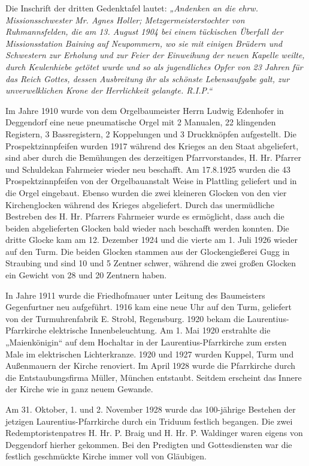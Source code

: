 \documentclass[12pt,a4paper]{book}
\begin{document}
Die Inschrift der dritten Gedenktafel lautet: \emph{„Andenken an die ehrw.
Missionsschwester Mr. Agnes Holler; Metzgermeisterstochter von Ruhmannsfelden,
die am 13. August 1904 bei einem tückischen Überfall der Missionsstation Baining
auf Neupommern, wo sie mit einigen Brüdern und Schwestern zur Erholung und zur
Feier der Einweihung der neuen Kapelle weilte, durch Keulenhiebe getötet wurde
und so als jugendliches Opfer von 23 Jahren für das Reich Gottes, dessen
Ausbreitung ihr als schönste Lebensaufgabe galt, zur unverwelklichen Krone der
Herrlichkeit gelangte. R.I.P.“}

Im Jahre 1910 wurde von dem Orgelbaumeister Herrn Ludwig Edenhofer in Deggendorf
eine neue pneumatische Orgel mit 2 Manualen, 22 klingenden Registern, 3
Bassregistern, 2 Koppelungen und 3 Druckknöpfen aufgestellt. Die
Prospektzinnpfeifen wurden 1917 während des Krieges an den Staat abgeliefert,
sind aber durch die Bemühungen des derzeitigen Pfarrvorstandes, H. Hr. Pfarrer
und Schuldekan Fahrmeier wieder neu beschafft. Am 17.8.1925 wurden die 43
Prospektzinnpfeifen von der Orgelbauanstalt Weise in Plattling geliefert und in
die Orgel eingebaut. Ebenso wurden die zwei kleineren Glocken von den vier
Kirchenglocken während des Krieges abgeliefert. Durch das unermüdliche Bestreben
des H. Hr. Pfarrers Fahrmeier wurde es ermöglicht, dass auch die beiden
abgelieferten Glocken bald wieder nach beschafft werden konnten. Die dritte
Glocke kam am 12. Dezember 1924 und die vierte am 1. Juli 1926 wieder auf den
Turm. Die beiden Glocken stammen aus der Glockengießerei Gugg in Straubing und
sind 10 und 5 Zentner schwer, während die zwei großen Glocken ein Gewicht von 28
und 20 Zentnern haben.

In Jahre 1911 wurde die Friedhofmauer unter Leitung des Baumeisters Gegenfurtner
neu aufgeführt. 1916 kam eine neue Uhr auf den Turm, geliefert von der
Turmuhrenfabrik E. Strobl, Regensburg. 1920 bekam die Laurentius-Pfarrkirche
elektrische Innenbeleuchtung. Am 1. Mai 1920 erstrahlte die „Maienkönigin“ auf
dem Hochaltar in der Laurentius-Pfarrkirche zum ersten Male im elektrischen
Lichterkranze. 1920 und 1927 wurden Kuppel, Turm und Außenmauern der Kirche
renoviert. Im April 1928 wurde die Pfarrkirche durch die Entstaubungsfirma
Müller, München entstaubt. Seitdem erscheint das Innere der Kirche wie in ganz
neuem Gewande.

Am 31. Oktober, 1. und 2. November 1928 wurde das 100-jährige Bestehen der
jetzigen Laurentius-Pfarrkirche durch ein Triduum festlich begangen. Die zwei
Redemptoristenpatres H. Hr. P. Braig und H. Hr. P. Waldinger waren eigens von
Deggendorf hierher gekommen. Bei den Predigten und Gottesdiensten war die
festlich geschmückte Kirche immer voll von Gläubigen.
\end{document}
